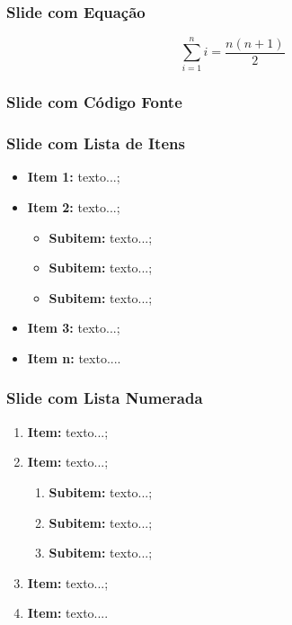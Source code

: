 \begin{frame}

    \frametitle{Slide com Equação}
    
    \begin{equation}
        \sum_{i=1}^{n} i = \frac{n(n+1)}{2}
        \label{eq:exemplo}
    \end{equation}
         
\end{frame}


\begin{frame}

    \frametitle{Slide com Código Fonte}
    
    \centering
    \resizebox{10cm}{!}{%
         
    }
    
\end{frame}


\begin{frame}

    \frametitle{Slide com Lista de Itens}
    
    \begin{itemize}
       	\item \textbf{Item 1:} texto...;
       	\item \textbf{Item 2:} texto...;
       	\begin{itemize}
       		\item \textbf{Subitem:} texto...;
       		\item \textbf{Subitem:} texto...;
       		\item \textbf{Subitem:} texto...;
       	\end{itemize}
       	\item \textbf{Item 3:} texto...;
       	\item \textbf{Item n:} texto....
    \end{itemize}
         
\end{frame}


\begin{frame}

    \frametitle{Slide com Lista Numerada}
    
    \begin{enumerate}
       	\item \textbf{Item:} texto...;
       	\item \textbf{Item:} texto...;
       	\begin{enumerate}
       		\item \textbf{Subitem:} texto...;
       		\item \textbf{Subitem:} texto...;
       		\item \textbf{Subitem:} texto...;
       	\end{enumerate}
       	\item \textbf{Item:} texto...;
       	\item \textbf{Item:} texto....
    \end{enumerate}
         
\end{frame}


